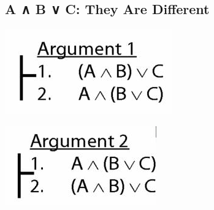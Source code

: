 \documentclass[12pt]{extarticle}
\begin{document}
\begin{multicols*}{3}
 
\section{A ∧ B ∨ C: They Are Different}
 
\begin{center}
\includegraphics[scale=0.3]{img/arg1_unit_153.png}
\end{center}
\begin{center}
\includegraphics[scale=0.3]{img/arg2_unit_153.png}
\end{center}
\vfill

 


\end{multicols*}
\end{document}
